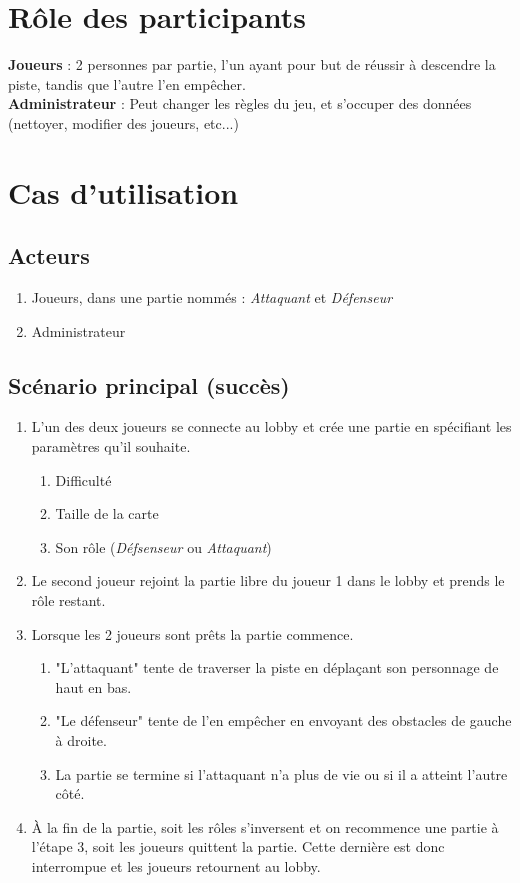\documentclass[a4paper,11pt]{article}
\begin{document}
	\section{Rôle des participants}

		\textbf{Joueurs} : 2 personnes par partie, l'un ayant pour but de réussir à descendre la piste, tandis que l'autre l'en empêcher. \\

		\textbf{Administrateur} : Peut changer les règles du jeu, et s'occuper des données (nettoyer, modifier des joueurs, etc...)

	\section{Cas d'utilisation}
		\subsection{Acteurs}
		\begin{enumerate}
			\item Joueurs, dans une partie nommés : \textit{Attaquant} et \textit{Défenseur}
			\item Administrateur
		\end{enumerate}
		\subsection{Scénario principal (succès)}
		\begin{enumerate}
			\item L'un des deux joueurs se connecte au lobby et crée une partie en spécifiant les paramètres qu'il souhaite.
			\begin{enumerate}
				\item Difficulté
				\item Taille de la carte
				\item Son rôle (\textit{Défsenseur} ou \textit{Attaquant})
			\end{enumerate}
			\item Le second joueur rejoint la partie libre du joueur 1 dans le lobby et prends le rôle restant.
			\item Lorsque les 2 joueurs sont prêts la partie commence.
			\begin{enumerate}
				\item "L'attaquant" tente de traverser la piste en déplaçant son personnage de haut en bas.
				\item "Le défenseur" tente de l'en empêcher en envoyant des obstacles de gauche à droite.
				\item La partie se termine si l'attaquant n'a plus de vie ou si il a atteint l'autre côté.
			\end{enumerate}
			\item À la fin de la partie, soit les rôles s'inversent et on recommence une partie à l'étape 3, soit les joueurs quittent la partie. Cette dernière est donc interrompue et les joueurs retournent au lobby.
		\end{enumerate}
\end{document}
